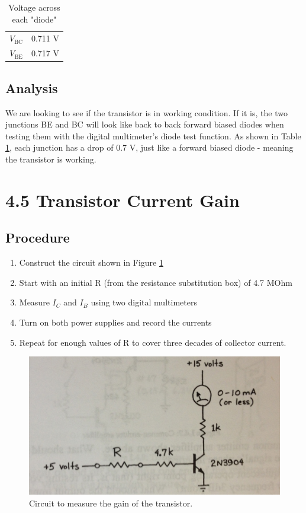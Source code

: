 \documentclass[12pt,letterpaper]{report}
\newlength \figwidth
\begin{document}
\begin{table}[ht]
\caption{Voltage across each "diode"} %
\centering 
    \begin{tabular}{| c | c |} 
    \hline
    $V_{\text{BC}}$ & 0.711 V \\
    $V_{\text{BE}}$ & 0.717 V \\
    \hline
    \end{tabular}
    \label{table:section_1}
\end{table}

\subsection*{Analysis}

We are looking to see if the transistor is in working condition. If it is, the two junctions BE and BC will look like back to back forward biased diodes when testing them with the digital multimeter's diode test function. As shown in Table \ref{table:section_1}, each junction has a drop of 0.7 V, just like a forward biased diode - meaning the transistor is working.

\section*{4.5 Transistor Current Gain}
\subsection*{Procedure}

\begin{enumerate}
\item Construct the circuit shown in Figure \ref{fig:4.5_circuit}
\item Start with an initial R (from the resistance substitution box) of 4.7 MOhm
\item Measure $I_C$ and $I_B$ using two digital multimeters
\item Turn on both power supplies and record the currents
\item Repeat for enough values of R to cover three decades of collector current.
\end{enumerate}

\begin{figure}[H]
\centering
\includegraphics[width=\figwidth, keepaspectratio=true]{lab5/circuit_2.jpg}
\caption{Circuit to measure the gain of the transistor.}
\label{fig:4.5_circuit}
\end{figure}
\end{document}
